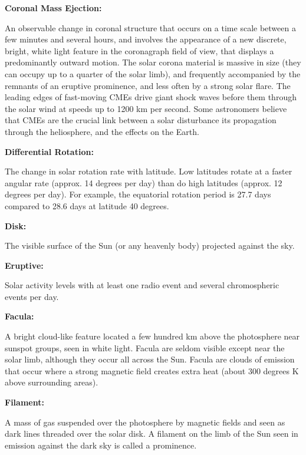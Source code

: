 \textbf{Coronal Mass Ejection:}
\begin{myindentpar}{1cm}
  An observable change in coronal structure that occurs on a time scale between a few minutes and several hours, and involves the appearance of a new discrete, bright, white light feature in the coronagraph field of view, that displays a predominantly outward motion. The solar corona material is massive in size (they can occupy up to a quarter of the solar limb), and frequently accompanied by the remnants of an eruptive prominence, and less often by a strong solar flare. The leading edges of fast-moving CMEs drive giant shock waves before them through the solar wind at speeds up to 1200 km per second. Some astronomers believe that CMEs are the crucial link between a solar disturbance its propagation through the heliosphere, and the effects on the Earth.
\end{myindentpar}

\textbf{Differential Rotation:}
\begin{myindentpar}{1cm}
  The change in solar rotation rate with latitude. Low latitudes rotate at a faster angular rate (approx. 14 degrees per day) than do high latitudes (approx. 12 degrees per day). For example, the equatorial rotation period is 27.7 days compared to 28.6 days at latitude 40 degrees.
\end{myindentpar}

\textbf{Disk:}
\begin{myindentpar}{1cm}
  The visible surface of the Sun (or any heavenly body) projected against the sky.
\end{myindentpar}

\textbf{Eruptive:}
\begin{myindentpar}{1cm}
  Solar activity levels with at least one radio event and several chromospheric events per day.
\end{myindentpar}

\textbf{Facula:}
\begin{myindentpar}{1cm}
  A bright cloud-like feature located a few hundred km above the photosphere near sunspot groups, seen in white light. Facula are seldom visible except near the solar limb, although they occur all across the Sun. Facula are clouds of emission that occur where a strong magnetic field creates extra heat (about 300 degrees K above surrounding areas).
\end{myindentpar}

\textbf{Filament:}
\begin{myindentpar}{1cm}
  A mass of gas suspended over the photosphere by magnetic fields and seen as dark lines threaded over the solar disk. A filament on the limb of the Sun seen in emission against the dark sky is called a prominence.
\end{myindentpar}

